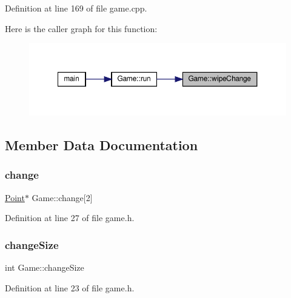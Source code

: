 Definition at line 169 of file game.\+cpp.

Here is the caller graph for this function\+:
\nopagebreak
\begin{figure}[H]
\begin{center}
\leavevmode
\includegraphics[width=350pt]{class_game_aa73688f1ba069a3f1989884099c58449_icgraph}
\end{center}
\end{figure}


\subsection{Member Data Documentation}
\mbox{\label{class_game_a87f9c54e60a724de2644769cd917dbce}} 
\subsubsection{\texorpdfstring{change}{change}}
{\footnotesize\ttfamily \mbox{\hyperlink{common_8h_aa9cfdb80b4ca12013a2de8a3b9b97981}{Point}}$\ast$ Game\+::change\mbox{[}2\mbox{]}\hspace{0.3cm}{\ttfamily [private]}}



Definition at line 27 of file game.\+h.

\mbox{\label{class_game_ae959d08e508fcef98dd07a2b9cd82e65}} 
\subsubsection{\texorpdfstring{changeSize}{changeSize}}
{\footnotesize\ttfamily int Game\+::change\+Size\hspace{0.3cm}{\ttfamily [private]}}



Definition at line 23 of file game.\+h.

\mbox{\label{class_game_a92148f2659c019b331e9da7deadbd8bc}} 
